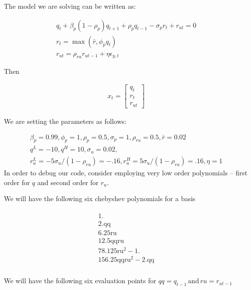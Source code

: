 \documentclass[12pt]{article}
\begin{document}
The model we are solving can be written as:


\begin{gather*}
q_{t} +\beta_p(1 - \rho_p)q_{t + 1} + \rho_pq_{t - 1} - \sigma_pr_{t} +
     r_{ut}=0\\
 r_{t} = \max (\bar{r}, \phi_pq_{t}) \\
 r_{ut} = \rho_{ru} r_{ut - 1} + \eta \epsilon_{y,t}
\end{gather*}

Then 
\newcommand{\xtmVec}{  \begin{bmatrix}
    q_t\\r_{t}\\r_{ut}
  \end{bmatrix}
}


\begin{gather*}
  x_t=\xtmVec
\end{gather*}

We are setting the parameters as follows:

\begin{gather*}
  \beta_p = 0.99, \phi_p = 1, 
\rho_p = 0.5, \sigma_p = 1, \rho_{ru} = 0.5,
  \bar{r} = 0.02 \\
 q^L = -10, q^H = 10, 
\sigma_u = 0.02,\\
   r_u^L = -5\sigma_u/(1 - \rho_{ru})=-.16, r_u^H=  5\sigma_u/(1 - \rho_{ru})=.16,
    \eta = 1
\end{gather*}
In order to debug our code, consider employing very low order polynomials --
first order for $q$ and second order for $r_u$.

We will have the following six chebyshev polynomials for a basis

\begin{gather*}
 \begin{array}{c}
                  1. \\
                  2. \text{qq} \\
                  6.25 \text{ru} \\
                  12.5 \text{qq} \text{ru} \\
                  78.125 \text{ru}^2-1. \\
                  156.25 \text{qq} \text{ru}^2-2. \text{qq} \\
                 \end{array}
\end{gather*}

We will have the following six evaluation points for $qq=q_{t-1}\, \text{and}\, ru=r_{ut-1}$
\end{document}
